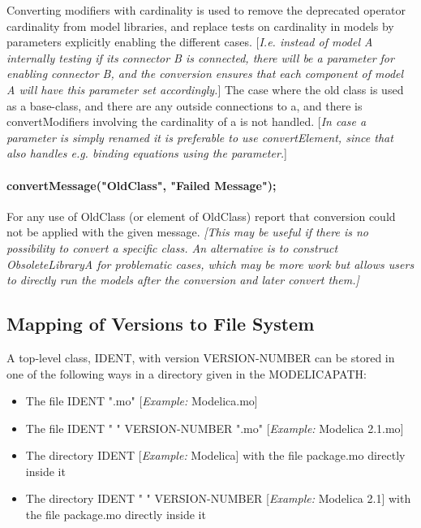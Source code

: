 \documentclass[10pt,a4paper]{report}
\def\doublelabel#1{\label{#1}\hypertarget{#1}{}}
\begin{document}
Converting modifiers with cardinality is used to remove the deprecated
operator cardinality from model libraries, and replace tests on
cardinality in models by parameters explicitly enabling the different
cases. {[}\emph{I.e. instead of model A internally testing if its
connector B is connected, there will be a parameter for enabling
connector B, and the conversion ensures that each component of model A
will have this parameter set accordingly.}{]} The case where the old
class is used as a base-class, and there are any outside connections to
a, and there is convertModifiers involving the cardinality of a is not
handled. {[}\emph{In case a parameter is simply renamed it is preferable
to use convertElement, since that also handles e.g. binding equations
using the parameter.}{]}

\paragraph{convertMessage("OldClass", "Failed Message");}\doublelabel{convertmessageoldclass-failed-message}

For any use of OldClass (or element of OldClass) report that conversion
could not be applied with the given message. \emph{{[}This may be useful
if there is no possibility to convert a specific class. An alternative
is to construct ObsoleteLibraryA for problematic cases, which may be
more work but allows users to directly run the models after the
conversion and later convert them.{]}}

\subsection{Mapping of Versions to File System}\doublelabel{mapping-of-versions-to-file-system}

A top-level class, IDENT, with version VERSION-NUMBER can be stored in
one of the following ways in a directory given in the MODELICAPATH:

\begin{itemize}
\item
  The file IDENT ".mo" {[}\emph{Example:} Modelica.mo{]}
\item
  The file IDENT " " VERSION-NUMBER ".mo" {[}\emph{Example:} Modelica
  2.1.mo{]}
\item
  The directory IDENT {[}\emph{Example:} Modelica{]} with the file
  package.mo directly inside it
\item
  The directory IDENT " " VERSION-NUMBER {[}\emph{Example:} Modelica
  2.1{]} with the file package.mo directly inside it
\end{itemize}
\end{document}
